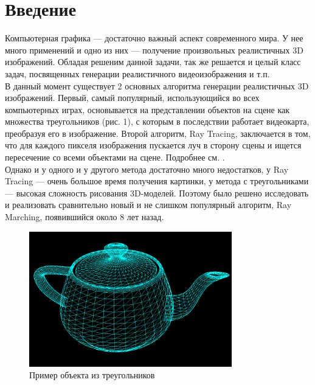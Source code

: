 \documentclass[14pt]{matmex-diploma}
\begin{document}
\maketitle
\tableofcontents
\section*{Введение}
Компьютерная графика --- достаточно важный аспект современного мира. У нее много применений \cite{wiki:cg} 
и одно из них --- получение произвольных реалистичных 3D изображений. Обладая решеним данной задачи, так же 
решается и целый класс задач, посвященных генерации реалистичного видеоизображения и т.п.
\\
В данный момент существует 2 основных алгоритма генерации реалистичных 3D изображений. Первый, самый популярный,
использующийся во всех компьютерных играх, основывается на представлении объектов на сцене как множества 
треугольников (рис. 1), с которым в последствии работает видеокарта, преобразуя его в изображение.
Второй алгоритм, Ray Tracing, заключается в том, что для каждого пикселя изображения пускается луч в сторону сцены 
и ищется пересечение со всеми объектами на сцене. Подробнее см. \cite{wiki:rt}.
\\
Однако и у одного и у другого метода достаточно много недостатков, у Ray Tracing --- очень большое время получения картинки,
у метода с треугольниками --- высокая сложность рисования 3D-моделей. Поэтому было решено исследовать и реализовать сравнительно 
новый и не слишком популярный алгоритм, Ray Marching, появившийся около 8 лет назад.

\begin{figure}[t]
\label{triangle_teapot}
\centering
\includegraphics[width = 250pt]{teapot.png}
\caption{Пример объекта из треугольников}
\end{figure}
\end{document}
